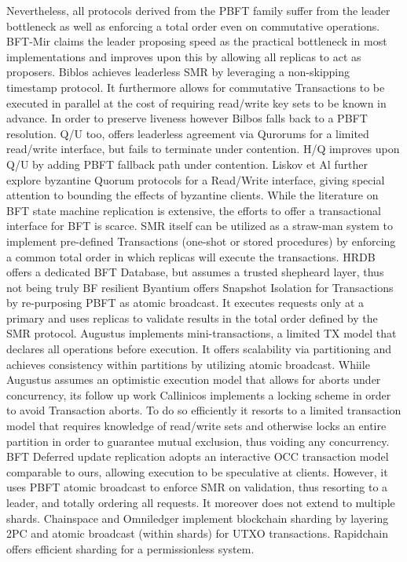 Nevertheless, all protocols derived from the PBFT family suffer from the leader bottleneck as well as enforcing a total order even on commutative operations. BFT-Mir claims the leader proposing speed as the practical bottleneck in most implementations and improves upon this by allowing all replicas to act as proposers.
Biblos achieves leaderless SMR by leveraging a non-skipping timestamp protocol. It furthermore allows for commutative Transactions to be executed in parallel at the cost of requiring read/write key sets to be known in advance. In order to preserve liveness however Bilbos falls back to a PBFT resolution. Q/U too, offers leaderless agreement via Qurorums for a limited read/write interface, but fails to terminate under contention. H/Q improves upon Q/U by adding PBFT fallback path under contention. Liskov et Al further explore byzantine Quorum protocols for a Read/Write interface, giving special attention to bounding the effects of byzantine clients. 
While the literature on BFT state machine replication is extensive, the efforts to offer a transactional interface for BFT is scarce. SMR itself can be utilized as a straw-man system to implement pre-defined Transactions (one-shot or stored procedures) by enforcing a common total order  in which replicas will execute the transactions. 
HRDB offers a dedicated BFT Database, but assumes a trusted shepheard layer, thus not being truly BF resilient
Byantium offers Snapshot Isolation for Transactions by re-purposing PBFT as atomic broadcast. It executes requests only at a primary and uses replicas to validate results in the total order defined by the SMR protocol. Augustus implements mini-transactions, a limited TX model that declares all operations before execution. It offers scalability via partitioning and achieves consistency within partitions by utilizing atomic broadcast. Whiile Augustus assumes an optimistic execution model that allows for aborts under concurrency, its follow up work Callinicos implements a locking scheme in order to avoid Transaction aborts. To do so efficiently it resorts to a limited transaction model that requires knowledge of read/write sets and otherwise locks an entire partition in order to guarantee mutual exclusion, thus voiding any concurrency. BFT Deferred update replication adopts an interactive OCC transaction model comparable to ours, allowing execution to be speculative at clients. However, it uses PBFT atomic broadcast to enforce SMR on validation, thus resorting to a leader, and totally ordering all requests. It moreover does not extend to multiple shards.
Chainspace and Omniledger implement blockchain sharding by layering 2PC and atomic broadcast (within shards) for UTXO transactions. Rapidchain offers efficient sharding for a permissionless system. 

\cite{kotla2007zyzzyva}
